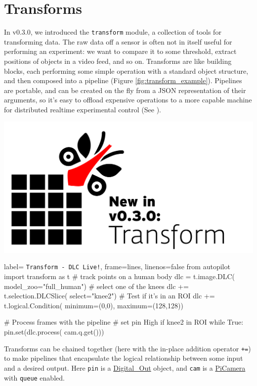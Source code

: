 \section{Transforms}
\label{sec:transforms}

In v0.3.0, we introduced the \texttt{transform} module, a collection of tools for transforming data. The raw data off a sensor is often not in itself useful for performing an experiment: we want to compare it to some threshold, extract positions of objects in a video feed, and so on. Transforms are like building blocks, each performing some simple operation with a standard object structure, and then composed into a pipeline (Figure \ref{fig:transform_example}). Pipelines are portable, and can be created on the fly from a JSON representation of their arguments, so it's easy to offload expensive operations to a more capable machine for distributed realtime experimental control (See \citep{kaneRealtimeLowlatencyClosedloop2020a}). 

\begin{marginfigure}[-8cm]
\includegraphics[width=\linewidth]{figures/transform_marginfig.pdf}
\end{marginfigure}

\begin{marginfigure}[-3.5cm]
\begin{pythoncode*}{
label= \texttt{Transform - DLC Live!},
frame=lines,
linenos=false}
from autopilot import transform as t
# track points on a human body
dlc = t.image.DLC(
    model_zoo="full_human")
# select one of the knees
dlc += t.selection.DLCSlice(
    select="knee2")
# Test if it's in an ROI
dlc += t.logical.Condition(
    minimum=(0,0),
    maximum=(128,128))

# Process frames with the pipeline
# set pin High if knee2 in ROI
while True:
    pin.set(dlc.process(
        cam.q.get()))
\end{pythoncode*}
\caption{Transforms can be chained together (here with the in-place addition operator \texttt{+=}) to make pipelines that encapsulate the logical relationship between some input and a desired output. Here \texttt{pin} is a \href{https://docs.auto-pi-lot.com/en/latest/hardware/gpio.html\#autopilot.hardware.gpio.Digital_Out}{Digital\_Out} object, and \texttt{cam} is a \href{https://docs.auto-pi-lot.com/en/latest/hardware/cameras.html\#autopilot.hardware.cameras.PiCamera}{PiCamera} with \texttt{queue} enabled.}
\label{fig:transform_example}

\end{marginfigure}

